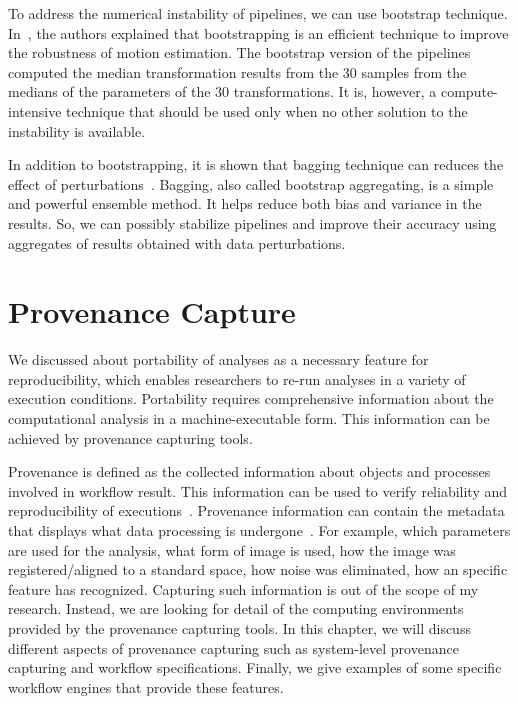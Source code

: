 To address the numerical instability of pipelines, we can use bootstrap 
technique. In~\cite{Glatard2018hbm}, the authors explained that bootstrapping 
is an efficient technique to improve the robustness of motion 
estimation. The bootstrap version of the pipelines computed the median 
transformation results from the 30 samples from the medians of the 
parameters of the 30 transformations. It is, however, a 
compute-intensive technique that should be used only when no other 
solution to the instability is available. 

In addition to bootstrapping, it is shown that bagging technique can 
reduces the effect of perturbations~\cite{breiman1996bagging, 
breiman1996heuristics}. Bagging, also called bootstrap aggregating, is 
a simple and powerful ensemble method. It helps reduce both bias and 
variance in the results. So, we can possibly stabilize pipelines and improve 
their accuracy using aggregates of results obtained with data 
perturbations. 


\section{Provenance Capture}

We discussed about portability of analyses as a necessary feature for 
reproducibility, which enables researchers to re-run analyses in a 
variety of execution conditions. Portability requires comprehensive 
information about the computational analysis in a machine-executable 
form. This information can be achieved by provenance capturing 
tools. 

Provenance is defined as the collected information about objects and 
processes involved in workflow result. This information can be 
used to verify reliability and reproducibility of 
executions~\cite{missier2013w3c}. Provenance information can contain the 
metadata that displays what data processing is 
undergone~\cite{nichols2017best}. For example, which parameters are 
used for the analysis, what form of image is used, how the image was 
registered/aligned to a standard space, how noise was eliminated, how 
an specific feature has recognized. Capturing such information is 
out of the scope of my research. Instead, we are looking for 
detail of the computing environments provided by the provenance 
capturing tools. In this chapter, we will discuss different aspects 
of provenance capturing such as system-level provenance capturing and 
workflow specifications. Finally, we give examples of some specific 
workflow engines that provide these features. 

